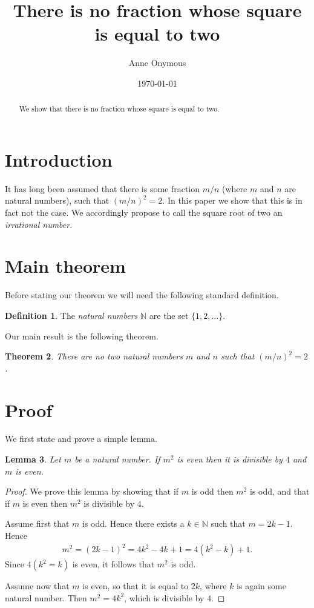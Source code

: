 \documentclass[12pt]{amsart}
\newtheorem{theorem}{Theorem}
\newtheorem{lemma}[theorem]{Lemma}
\theoremstyle{definition}
\newtheorem{definition}[theorem]{Definition}
\numberwithin{equation}{section}
\numberwithin{theorem}{section}
\begin{document}
\title[]{There is no fraction whose square is equal to two}

\author[]{Anne Onymous}
\address{Somewhere in ancient Greece.}


\date{\today}


\begin{abstract}
  We show that there is no fraction whose square is equal to two.
\end{abstract}

\maketitle

\section{Introduction}
It has long been assumed that there is some fraction $m/n$ (where $m$
and $n$ are natural numbers), such that $(m/n)^2=2$. In this paper we
show that this is in fact not the case. We accordingly propose to call
the square root of two an {\em irrational number}.


\section{Main theorem}
Before stating our theorem we will need the following standard definition.
\begin{definition}
  The {\em natural numbers} $\mathbb{N}$ are the set $\{1,2,\ldots\}$.
\end{definition}

Our main result is the following theorem.
\begin{theorem}
  \label{thm:sqrt}
  There are no two natural numbers $m$ and $n$ such that $(m/n)^2=2$.
\end{theorem}

\section{Proof}
We first state and prove a simple lemma.
\begin{lemma}
  \label{lem:sqr}
  Let $m$ be a natural number. If $m^2$ is even then it is divisible
  by $4$ and $m$ is even.
\end{lemma}
\begin{proof}
  We prove this lemma by showing that if $m$ is odd then $m^2$ is odd,
  and that if $m$ is even then $m^2$ is divisible by $4$.

  Assume first that $m$ is odd. Hence there exists a $k \in \mathbb{N}$
  such that $m = 2k-1$. Hence
  \begin{align*}
    m^2 = (2k-1)^2 = 4k^2-4k+1 = 4(k^2-k) + 1.
  \end{align*}
  Since $4(k^2=k)$ is even, it follows that $m^2$ is odd.

  Assume now that $m$ is even, so that it is equal to $2k$, where $k$
  is again some natural number. Then $m^2=4k^2$, which is
  divisible by $4$.
\end{proof}
\end{document}
